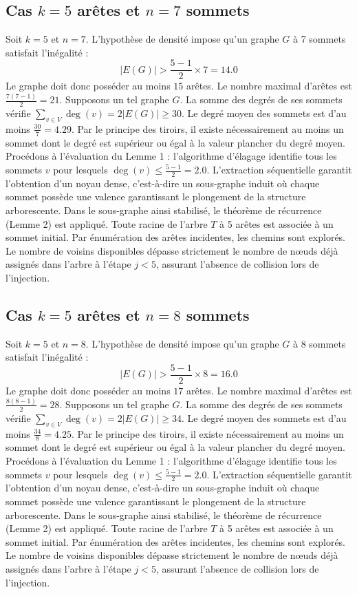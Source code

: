 \documentclass[12pt,a4paper]{article}
\begin{document}
\subsection{Cas $k = 5$ arêtes et $n = 7$ sommets}
Soit $k = 5$ et $n = 7$. L'hypothèse de densité impose qu'un graphe $G$ à 7 sommets satisfait l'inégalité :
$$ |E(G)| > \frac{5-1}{2} \times 7 = 14.0 $$
Le graphe doit donc posséder au moins $15$ arêtes. Le nombre maximal d'arêtes est $\frac{7(7-1)}{2} = 21$.
Supposons un tel graphe $G$. La somme des degrés de ses sommets vérifie $\sum_{v \in V} \deg(v) = 2|E(G)| \geq 30$.
Le degré moyen des sommets est d'au moins $\frac{30}{7} = 4.29$.
Par le principe des tiroirs, il existe nécessairement au moins un sommet dont le degré est supérieur ou égal à la valeur plancher du degré moyen.
Procédons à l'évaluation du Lemme 1 : l'algorithme d'élagage identifie tous les sommets $v$ pour lesquels $\deg(v) \leq \frac{5-1}{2} = 2.0$.
L'extraction séquentielle garantit l'obtention d'un noyau dense, c'est-à-dire un sous-graphe induit où chaque sommet possède une valence garantissant le plongement de la structure arborescente.
Dans le sous-graphe ainsi stabilisé, le théorème de récurrence (Lemme 2) est appliqué. Toute racine de l'arbre $T$ à 5 arêtes est associée à un sommet initial. Par énumération des arêtes incidentes, les chemins sont explorés. Le nombre de voisins disponibles dépasse strictement le nombre de nœuds déjà assignés dans l'arbre à l'étape $j < 5$, assurant l'absence de collision lors de l'injection.

\subsection{Cas $k = 5$ arêtes et $n = 8$ sommets}
Soit $k = 5$ et $n = 8$. L'hypothèse de densité impose qu'un graphe $G$ à 8 sommets satisfait l'inégalité :
$$ |E(G)| > \frac{5-1}{2} \times 8 = 16.0 $$
Le graphe doit donc posséder au moins $17$ arêtes. Le nombre maximal d'arêtes est $\frac{8(8-1)}{2} = 28$.
Supposons un tel graphe $G$. La somme des degrés de ses sommets vérifie $\sum_{v \in V} \deg(v) = 2|E(G)| \geq 34$.
Le degré moyen des sommets est d'au moins $\frac{34}{8} = 4.25$.
Par le principe des tiroirs, il existe nécessairement au moins un sommet dont le degré est supérieur ou égal à la valeur plancher du degré moyen.
Procédons à l'évaluation du Lemme 1 : l'algorithme d'élagage identifie tous les sommets $v$ pour lesquels $\deg(v) \leq \frac{5-1}{2} = 2.0$.
L'extraction séquentielle garantit l'obtention d'un noyau dense, c'est-à-dire un sous-graphe induit où chaque sommet possède une valence garantissant le plongement de la structure arborescente.
Dans le sous-graphe ainsi stabilisé, le théorème de récurrence (Lemme 2) est appliqué. Toute racine de l'arbre $T$ à 5 arêtes est associée à un sommet initial. Par énumération des arêtes incidentes, les chemins sont explorés. Le nombre de voisins disponibles dépasse strictement le nombre de nœuds déjà assignés dans l'arbre à l'étape $j < 5$, assurant l'absence de collision lors de l'injection.
\end{document}
